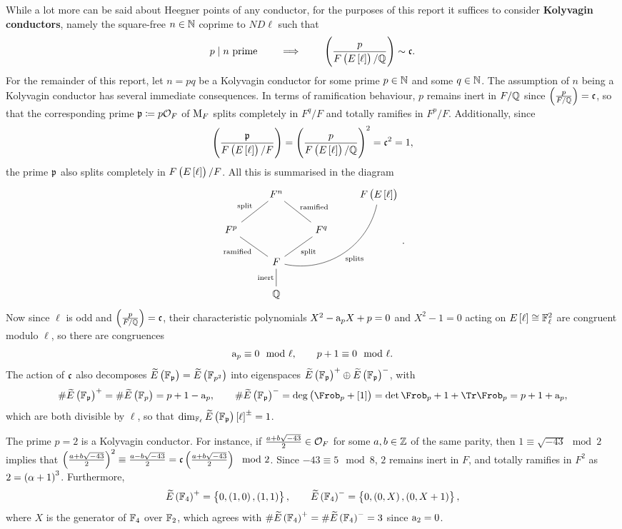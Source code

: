While a lot more can be said about Heegner points of any conductor, for the purposes of this report it suffices to consider \textbf{Kolyvagin conductors}, namely the square-free $ n \in \mathbb{N} $ coprime to $ ND\ell $ such that
$$ p \mid n \ \text{prime} \qquad \implies \qquad \br{\dfrac{p}{F\br{E\sbr{\ell}} / \QQ}} \sim \ccc. $$
For the remainder of this report, let $ n = pq $ be a Kolyvagin conductor for some prime $ p \in \mathbb{N} $ and some $ q \in \mathbb{N} $. The assumption of $ n $ being a Kolyvagin conductor has several immediate consequences. In terms of ramification behaviour, $ p $ remains inert in $ F / \mathbb{Q} $ since $ \br{\tfrac{p}{F / \QQ}} = \ccc $, so that the corresponding prime $ \mathfrak{p} \coloneqq p\mathcal{O}_F $ of $ \mathrm{M}_F $ splits completely in $ F^q / F $ and totally ramifies in $ F^p / F $. Additionally, since
$$ \br{\dfrac{\ppp}{F\br{E\sbr{\ell}} / F}} = \br{\dfrac{p}{F\br{E\sbr{\ell}} / \QQ}}^2 = \ccc^2 = 1, $$
the prime $ \mathfrak{p} $ also splits completely in $ F\br{E\sbr{\ell}} / F $. All this is summarised in the diagram
$$
\begin{tikzcd}
& F^n & & F\br{E\sbr{\ell}} \\
F^p \arrow[dash]{ur}{\text{split}} & & F^q \arrow[dash]{ul}[swap]{\text{ramified}} & \\
& F \arrow[dash]{ul}{\text{ramified}} \arrow[dash]{ur}[swap]{\text{split}} \arrow[bend right=45, dash]{uurr}[swap]{\text{splits}} & & \\
& \QQ \arrow[dash]{u}{\text{inert}} & &
\end{tikzcd}.
$$
Now since $ \ell $ is odd and $ \br{\tfrac{p}{F / \QQ}} = \ccc $, their characteristic polynomials $ X^2 - \mathrm{a}_pX + p = 0 $ and $ X^2 - 1 = 0 $ acting on $ E\sbr{\ell} \cong \FF_\ell^2 $ are congruent modulo $ \ell $, so there are congruences
$$ \mathrm{a}_p \equiv 0 \mod \ell, \qquad p + 1 \equiv 0 \mod \ell. $$
The action of $ \mathfrak{c} $ also decomposes $ \widetilde{E}\br{\FF_\ppp} = \widetilde{E}\br{\FF_{p^2}} $ into eigenspaces $ \widetilde{E}\br{\FF_\ppp}^+ \oplus \widetilde{E}\br{\FF_\ppp}^- $, with
$$ \#\widetilde{E}\br{\FF_\ppp}^+ = \#\widetilde{E}\br{\FF_p} = p + 1 - \a_p, \qquad \#\widetilde{E}\br{\FF_\ppp}^- = \deg \br{\Frob_p + \sbr{1}} = \det \Frob_p + 1 + \Tr \Frob_p = p + 1 + \a_p, $$
which are both divisible by $ \ell $, so that $ \dim_{\FF_\ell} \widetilde{E}\br{\FF_\ppp}\sbr{\ell}^\pm = 1 $.

\pagebreak

\begin{example}
The prime $ p = 2 $ is a Kolyvagin conductor. For instance, if $ \tfrac{a + b\sqrt{-43}}{2} \in \mathcal{O}_F $ for some $ a, b \in \mathbb{Z} $ of the same parity, then $ 1 \equiv \sqrt{-43} \mod 2 $ implies that $ \br{\tfrac{a + b\sqrt{-43}}{2}}^2 \equiv \tfrac{a - b\sqrt{-43}}{2} = \ccc\br{\tfrac{a + b\sqrt{-43}}{2}} \mod 2 $. Since $ -43 \equiv 5 \mod 8 $, $ 2 $ remains inert in $ F $, and totally ramifies in $ F^2 $ as $ 2 = \br{\alpha + 1}^3 $. Furthermore,
$$ \widetilde{E}\br{\FF_4}^+ = \cbr{0, \br{1, 0}, \br{1, 1}}, \qquad \widetilde{E}\br{\FF_4}^- = \cbr{0, \br{0, X}, \br{0, X + 1}}, $$
where $ X $ is the generator of $ \mathbb{F}_4 $ over $ \mathbb{F}_2 $, which agrees with $ \#\widetilde{E}\br{\FF_4}^+ = \#\widetilde{E}\br{\FF_4}^- = 3 $ since $ \mathrm{a}_2 = 0 $.
\end{example}

